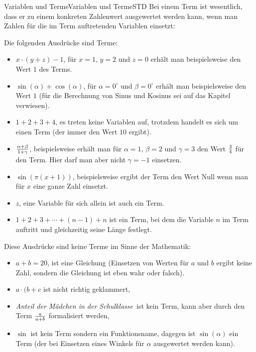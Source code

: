 \begin{MXContent}{Variablen und Terme}{Variablen und Terme}{STD}
Bei einem Term ist wesentlich, dass er zu einem konkreten Zahlenwert ausgewertet werden kann,
wenn man Zahlen für die im Term auftretenden Variablen einsetzt:

\begin{MExample}
Die folgenden Ausdrücke sind Terme:
\begin{itemize}
\item{$x\cdot (y+z)-1$, für $x=1$, $y=2$ und $z=0$ erhält man beispielsweise den Wert $1$ des Terms.}
\item{$\sin(\alpha)+\cos(\alpha)$, für $\alpha=0^\circ$ und $\beta=0^\circ$ erhält man beispielsweise den Wert $1$ (für die Berechnung von Sinus und Kosinus sei auf das Kapitel  verwiesen).}
\item{$1+2+3+4$, es treten keine Variablen auf, trotzdem handelt es sich um einen Term (der immer den Wert $10$ ergibt).}
\item{$\tfrac{\alpha+\beta}{1+\gamma}$, beispielsweise erhält man für $\alpha=1$, $\beta=2$ und $\gamma=3$ den Wert $\tfrac{3}{4}$ für den Term.
Hier darf man aber nicht $\gamma=-1$ einsetzen.}
\item{$\sin(\pi (x+1))$, beispielsweise ergibt der Term den Wert Null wenn man für $x$ eine ganze Zahl einsetzt.}
\item{$z$, eine Variable für sich allein ist auch ein Term.}
\item{$1+2+3+\cdots+(n-1)+n$ ist ein Term, bei dem die Variable $n$ im Term auftritt und gleichzeitig seine Länge festlegt.}
\end{itemize}
\end{MExample}

\begin{MExample}
Diese Ausdrücke sind keine Terme im Sinne der Mathematik:
\begin{itemize}
\item{$a+b=20$, ist eine Gleichung (Einsetzen von Werten für $a$ und $b$ ergibt keine Zahl, sondern die Gleichung ist eben wahr oder falsch).}
\item{$a\cdot (b+c$ ist nicht richtig geklammert,}
\item{\glqq\textit{Anteil der Mädchen in der Schulklasse}\grqq\ ist kein Term, kann aber durch den Term $\tfrac{a}{a+b}$ formalisiert werden,}
\item{$\sin$ ist kein Term sondern ein Funktionsname, dagegen ist $\sin(\alpha)$ ein Term (der bei Einsetzen eines Winkels für $\alpha$ ausgewertet werden kann).}
\end{itemize}
\end{MExample}


\end{MXContent}
